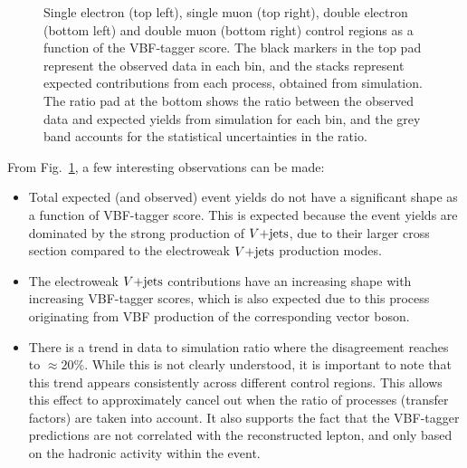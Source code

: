 \begin{figure}[htbp]
    \caption{Single electron (top left), single muon (top right), double electron (bottom left) and double muon (bottom right) control regions 
    as a function of the VBF-tagger score. The black markers in the top pad
    represent the observed data in each bin, and the stacks represent expected contributions from each process, obtained from simulation. The ratio pad
    at the bottom shows the ratio between the observed data and expected yields from simulation for each bin, and the grey band accounts for the statistical 
    uncertainties in the ratio.}
    \label{fig:single_lep_crs_vbfml}
\end{figure}

From Fig.~\ref{fig:single_lep_crs_vbfml}, a few interesting observations can be made:

\begin{itemize}
    \item Total expected (and observed) event yields do not have a significant shape as a function of VBF-tagger score. 
    This is expected because the event yields are dominated by the strong production of $V\text{+jets}$, due to their larger cross section
    compared to the electroweak $V\text{+jets}$ production modes.
    \item The electroweak $V\text{+jets}$ contributions have an increasing shape with increasing VBF-tagger
    scores, which is also expected due to this process originating from VBF production of the corresponding vector boson.
    \item There is a trend in data to simulation ratio where the disagreement reaches to $\approx 20\%$. While this is not clearly
    understood, it is important to note that this trend appears consistently across different control regions. This allows this effect
    to approximately cancel out when the ratio of processes (transfer factors) are taken into account. It also supports the fact that
    the VBF-tagger predictions are not correlated with the reconstructed lepton, and only based on the hadronic activity within the event.  
\end{itemize}

